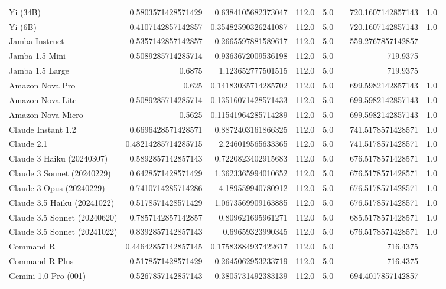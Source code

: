\begin{table}[htp]
{\begin{tabular}{lrrrrrrr}
Yi (34B) & 0.5803571428571429 & 0.6384105682373047 & 112.0 & 5.0 &  & 720.1607142857143 & 1.0 \\
Yi (6B) & 0.4107142857142857 & 0.35482590326241087 & 112.0 & 5.0 &  & 720.1607142857143 & 1.0 \\
Jamba Instruct & 0.5357142857142857 & 0.2665597881589617 & 112.0 & 5.0 &  & 559.2767857142857 &  \\
Jamba 1.5 Mini & 0.5089285714285714 & 0.9363672009536198 & 112.0 & 5.0 &  & 719.9375 &  \\
Jamba 1.5 Large & 0.6875 & 1.123652777501515 & 112.0 & 5.0 &  & 719.9375 &  \\
Amazon Nova Pro & 0.625 & 0.14183035714285702 & 112.0 & 5.0 &  & 699.5982142857143 & 1.0 \\
Amazon Nova Lite & 0.5089285714285714 & 0.13516071428571433 & 112.0 & 5.0 &  & 699.5982142857143 & 1.0 \\
Amazon Nova Micro & 0.5625 & 0.11541964285714289 & 112.0 & 5.0 &  & 699.5982142857143 & 1.0 \\
Claude Instant 1.2 & 0.6696428571428571 & 0.8872403161866325 & 112.0 & 5.0 &  & 741.5178571428571 & 1.0 \\
Claude 2.1 & 0.48214285714285715 & 2.246019565633365 & 112.0 & 5.0 &  & 741.5178571428571 & 1.0 \\
Claude 3 Haiku (20240307) & 0.5892857142857143 & 0.7220823402915683 & 112.0 & 5.0 &  & 676.5178571428571 & 1.0 \\
Claude 3 Sonnet (20240229) & 0.6428571428571429 & 1.3623365994010652 & 112.0 & 5.0 &  & 676.5178571428571 & 1.0 \\
Claude 3 Opus (20240229) & 0.7410714285714286 & 4.189559940780912 & 112.0 & 5.0 &  & 676.5178571428571 & 1.0 \\
Claude 3.5 Haiku (20241022) & 0.5178571428571429 & 1.0673569909163885 & 112.0 & 5.0 &  & 676.5178571428571 & 1.0 \\
Claude 3.5 Sonnet (20240620) & 0.7857142857142857 & 0.809621695961271 & 112.0 & 5.0 &  & 685.5178571428571 & 1.0 \\
Claude 3.5 Sonnet (20241022) & 0.8392857142857143 & 0.69659323990345 & 112.0 & 5.0 &  & 676.5178571428571 & 1.0 \\
Command R & 0.44642857142857145 & 0.17583884937422617 & 112.0 & 5.0 &  & 716.4375 &  \\
Command R Plus & 0.5178571428571429 & 0.2645062953233719 & 112.0 & 5.0 &  & 716.4375 &  \\
Gemini 1.0 Pro (001) & 0.5267857142857143 & 0.3805731492383139 & 112.0 & 5.0 &  & 694.4017857142857 &  \\

\end{tabular}}
\end{table}
